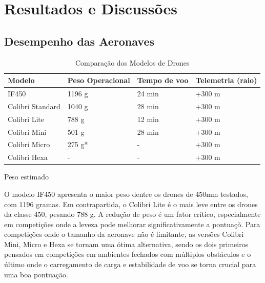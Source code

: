 \documentclass[conference]{IEEEtran}
\begin{document}
\section{Resultados e Discussões}

\subsection{Desempenho das Aeronaves}

\begin{table}[htbp]
\centering
\caption{Comparação dos Modelos de Drones}
\label{tab:drone_comparison}
\begin{tabularx}{\columnwidth}{|l|X|X|X|}
\hline
\textbf{Modelo}         & \textbf{Peso Operacional} & \textbf{Tempo de voo} & \textbf{Telemetria (raio)} \\ \hline
IF450                  & 1196 g                    & 24 min               & +300 m                     \\ \hline
Colibri Standard       & 1040 g                    & 28 min               & +300 m                     \\ \hline
Colibri Lite           & 788 g                     & 12 min               & +300 m                     \\ \hline
Colibri Mini           & 501 g                     & 28 min               & +300 m                     \\ \hline
Colibri Micro          & 275 g*                    & -                    & +300 m                     \\ \hline
Colibri Hexa           & -                         & -                    & +300 m                     \\ \hline
\end{tabularx}
\newline
\small *Peso estimado
\end{table}

O modelo IF450 apresenta o maior peso dentre os drones de 450mm testados, com 1196 gramas. Em contrapartida, o Colibri Lite é o mais leve entre os drones da classe 450, pesando 788 g. A redução de peso é um fator crítico, especialmente em competições onde a leveza pode melhorar significativamente a pontuaçõ. Para competições onde o tamanho da aeronave não é limitante, as versões Colibri Mini, Micro e Hexa se tornam uma ótima alternativa, sendo os dois primeiros pensados em competições em ambientes fechados com múltiplos obstáculos e o último onde o carregamento de carga e estabilidade de voo se torna crucial para uma boa pontuação.
\end{document}
